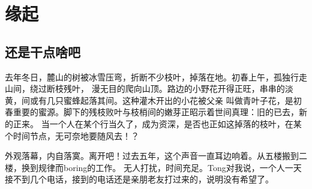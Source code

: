 \chapter{缘起}

\section{还是干点啥吧}
去年冬日，麓山的树被冰雪压弯，折断不少枝叶，掉落在地。初春上午，孤独行走山间，绕过断枝残叶，
漫无目的爬向山顶。路边的小野花开得正旺，串串的淡黄，间或有几只蜜蜂起落其间。这种灌木开出的小花被父亲
叫做青叶子花，是初春重要的蜜源。脚下的残枝败叶与枝梢间的嫩芽正昭示着世间真理：旧的已去，新的正来。
当一个人在某个行当久了，成为资深，是否也正如这掉落的枝叶，在某个时间节点，无可奈地要随风去！？

外观落幕，内自落寞。离开吧！过去五年，这个声音一直耳边响着。从五楼搬到二楼，换到规律而boring的工作。
无人打扰，时间充足。Tong对我说，一个人一天接不到几个电话，接到的电话还是亲朋老友打过来的，说明没有希望了。

